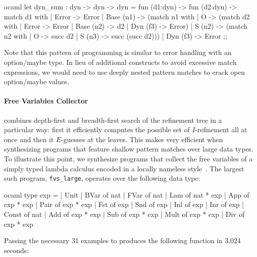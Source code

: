 \begin{center}
  \begin{cminted}{ocaml}
let dyn_sum : dyn -> dyn -> dyn =
  fun (d1:dyn) ->
    fun (d2:dyn) ->
      match d1 with
        | Error -> Error
        | Base (n1) -> (match n1 with
                          | O -> (match d2 with
                                    | Error -> Error
                                    | Base (n2) -> d2
                                    | Dyn (f3) -> Error)
                          | S (n2) -> (match n2 with
                                         | O -> succ d2
                                         | S (n3) -> succ (succ d2)))
        | Dyn (f3) -> Error
;;
  \end{cminted}
\end{center}

Note that this pattern of programming is similar to error handling with an option/maybe type.
In lieu of additional constructs to avoid excessive match expressions, we would need to use deeply nested pattern matches to crack open option/maybe values.

\paragraph{Free Variables Collector}

\myth{} combines depth-first and breadth-first search of the refinement tree in a particular way: first it efficiently computes the possible set of $I$-refinement all at once and then it $E$-guesses at the leaves.
This makes \myth{} very efficient when synthesizing programs that feature shallow pattern matches over large data types.
To illustrate this point, we synthesize programs that collect the free variables of a simply typed lambda calculus encoded in a locally nameless style~\citep{aydemir-popl-2008}.
The largest such program, \texttt{fvs\_large}, operates over the following data type:

\begin{center}
  \begin{cminted}{ocaml}
type exp =
  | Unit
  | BVar of nat
  | FVar of nat
  | Lam of nat * exp
  | App of exp * exp
  | Pair of exp * exp
  | Fst of exp
  | Snd of exp
  | Inl of exp
  | Inr of exp
  | Const of nat
  | Add of exp * exp
  | Sub of exp * exp
  | Mult of exp * exp
  | Div of exp * exp
  \end{cminted}
\end{center}

Passing the necessary 31 examples to \myth{} produces the following function in 3.024 seconds:

